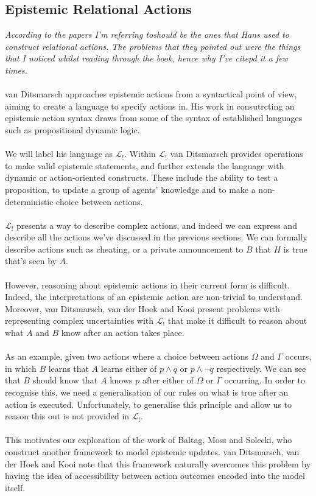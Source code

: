 \documentclass[12pt, a4paper, twoside]{article}
\begin{document}
\subsection{Epistemic Relational Actions} \label{epi_acts}
{\em According to \citep{hoek2008dynamic} the papers I'm referring toshould be
	the ones that Hans used to construct relational actions.
The problems that they pointed out were the things that I noticed whilst reading
through the book, hence why I've citepd it a few times.}\\
\\
van Ditsmarsch approaches epistemic actions from a syntactical point of view,
aiming to create a language to specify actions in.
His work in consutrcting an epistemic action syntax draws from some of the
syntax of established languages such as propositional dynamic
logic.\citep{ditmarsch99knowledge,ditmarsch2002dga}\\
\\
We will label his language as $\mathcal{L}_{!}$.
Within $\mathcal{L}_{!}$ van Ditsmarsch provides operations to make valid
epistemic statements, and further extends the language with dynamic or
action-oriented constructs.
These include the ability to test a proposition, to update a group of agents'
knowledge and to make a non-deterministic choice between actions.\\
\\
$\mathcal{L}_{!}$ presents a way to describe complex actions, and indeed we can
express and describe all the actions we've discussed in the previous sections.
We can formally describe actions such as cheating, or a private
announcement to $B$ that $H$ is true that's seen by $A$.\\
\\
However, reasoning about epistemic actions in their current form is difficult.
Indeed, the interpretations of an epistemic action are non-trivial to
understand.
Moreover, van Ditsmarsch, van der Hoek and Kooi present problems with
representing complex uncertainties with $\mathcal{L}_{!}$ that make it difficult
to reason about what $A$ and $B$ know after an action takes place.\\
\\
As an example, given two actions where a choice between actions $\Omega$ and
$\Gamma$ occurs, in which $B$ learns that $A$ learns either of $p \land q$ or
$p \land \neg q$ respectively.
We can see that $B$ should know that $A$ knows $p$ after either of $\Omega$ or
$\Gamma$ occurring.
In order to recognise this, we need a generalisation of our rules on what is
true after an action is executed.
Unfortunately, to generalise this principle and allow us to reason this out is
not provided in $\mathcal{L}_{!}$.\citep{hoek2008dynamic}\\
\\
This motivates our exploration of the work of Baltag, Moss and Solecki, who construct
another framework to model epistemic updates.
van Ditsmarsch, van der Hoek and Kooi note that this framework naturally
overcomes this problem by having the idea of accessibility between action
outcomes encoded into the model itself.
\end{document}
